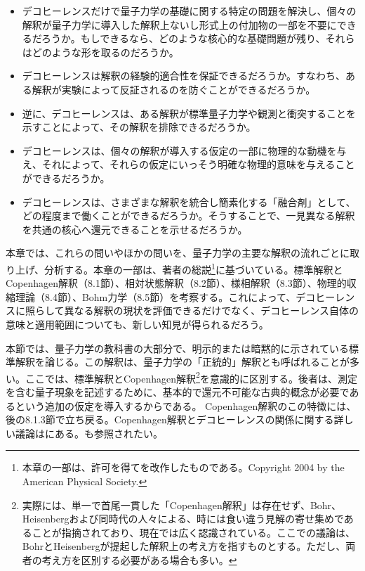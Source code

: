 \hypertarget{srcpage:330}{}\label{srcpage:330}
\begin{itemize}
\item デコヒーレンスだけで量子力学の基礎に関する特定の問題を解決し、個々の解釈が量子力学に導入した解釈上ないし形式上の付加物の一部を不要にできるだろうか。もしできるなら、どのような核心的な基礎問題が残り、それらはどのような形を取るのだろうか。
\item デコヒーレンスは解釈の経験的適合性を保証できるだろうか。すなわち、ある解釈が実験によって反証されるのを防ぐことができるだろうか。
\item 逆に、デコヒーレンスは、ある解釈が標準量子力学や観測と衝突することを示すことによって、その解釈を排除できるだろうか。
\item デコヒーレンスは、個々の解釈が導入する仮定の一部に物理的な動機を与え、それによって、それらの仮定にいっそう明確な物理的意味を与えることができるだろうか。
\item デコヒーレンスは、さまざまな解釈を統合し簡素化する「融合剤」として、どの程度まで働くことができるだろうか。そうすることで、一見異なる解釈を共通の核心へ還元できることを示せるだろうか。
\end{itemize}
本章では、これらの問いやほかの問いを、量子力学の主要な解釈の流れごとに取り上げ、分析する。本章の一部は、著者の総説\cite{ref001}\footnote{本章の一部は、許可を得て\cite{ref001}を改作したものである。Copyright 2004 by the American Physical Society.}に基づいている。標準解釈とCopenhagen解釈（8.1節）、相対状態解釈（8.2節）、様相解釈（8.3節）、物理的収縮理論（8.4節）、Bohm力学（8.5節）を考察する。これによって、デコヒーレンスに照らして異なる解釈の現状を評価できるだけでなく、デコヒーレンス自体の意味と適用範囲についても、新しい知見が得られるだろう。

本節では、量子力学の教科書の大部分で、明示的または暗黙的に示されている標準解釈を論じる。この解釈は、量子力学の「正統的」解釈とも呼ばれることが多い。ここでは、標準解釈とCopenhagen解釈\footnote{実際には、単一で首尾一貫した「Copenhagen解釈」は存在せず、Bohr、Heisenbergおよび同時代の人々による、時には食い違う見解の寄せ集めであることが指摘されており\cite{ref387}、現在では広く認識されている。ここでの議論は、BohrとHeisenbergが提起した解釈上の考え方を指すものとする。ただし、両者の考え方を区別する必要がある場合も多い。}を意識的に区別する。後者は、測定を含む量子現象を記述するために、基本的で還元不可能な古典的概念が必要であるという追加の仮定を導入するからである。
\hypertarget{srcpage:331}{}\label{srcpage:331}
Copenhagen解釈のこの特徴には、後の8.1.3節で立ち戻る。Copenhagen解釈とデコヒーレンスの関係に関する詳しい議論は\cite{ref388}にある。\cite{ref389,ref390}も参照されたい。

